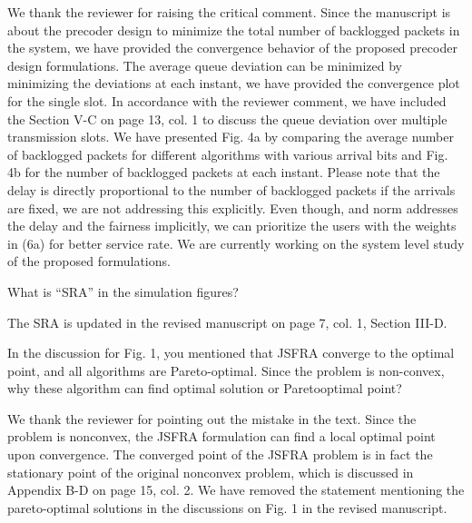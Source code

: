 \begin{itemize}
\resp We thank the reviewer for raising the critical comment. Since the manuscript is about the precoder design to minimize the total number of backlogged packets in the system, we have provided the convergence behavior of the proposed precoder design formulations. The average queue deviation can be minimized by minimizing the deviations at each instant, we have provided the convergence plot for the single slot. In accordance with the reviewer comment, we have included the Section V-C on page 13, col. 1 to discuss the queue deviation over multiple transmission slots. We have presented Fig. 4a by comparing the average number of backlogged packets for different algorithms with various arrival bits and Fig. 4b for the number of backlogged packets at each instant. Please note that the delay is directly proportional to the number of backlogged packets if the arrivals are fixed, we are not addressing this explicitly. Even though,  and \me{\ell_{\infty}} norm addresses the delay and the fairness implicitly, we can prioritize the users with the weights  in (6a) for better service rate. We are currently working on the system level study of the proposed formulations.

 What is “SRA” in the simulation figures?

\resp The \acf{SRA} is updated in the revised manuscript on page 7, col. 1, Section III-D.

 In the discussion for Fig. 1, you mentioned that JSFRA converge to the optimal point, and all algorithms are Pareto-optimal. Since the problem is non-convex, why these algorithm can find optimal solution or Paretooptimal point? 

\resp We thank the reviewer for pointing out the mistake in the text. Since the problem is nonconvex, the JSFRA formulation can find a local optimal point upon convergence. The converged point of the JSFRA problem is in fact the stationary point of the original nonconvex problem, which is discussed in Appendix B-D on page 15, col. 2. We have removed the statement mentioning the pareto-optimal solutions in the discussions on Fig. 1 in the revised manuscript.

\end{itemize}
